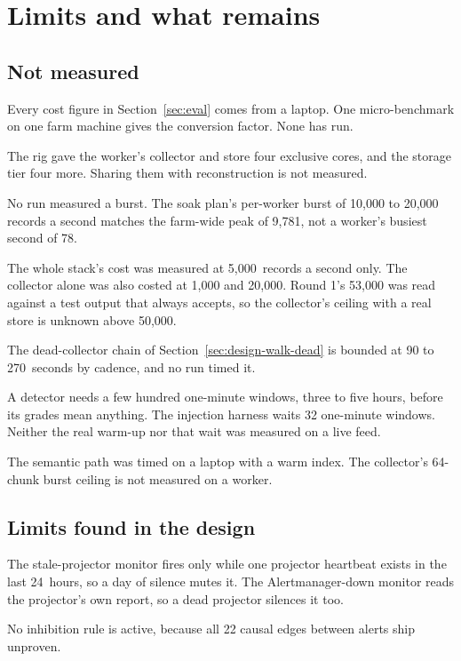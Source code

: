 \section{Limits and what remains}\label{sec:limits}

\subsection{Not measured}\label{sec:limits-unmeasured}

Every cost figure in Section~\ref{sec:eval} comes from a laptop. One micro-benchmark on one farm machine gives the conversion factor. None has run.

The rig gave the worker's collector and store four exclusive cores, and the storage tier four more. Sharing them with reconstruction is not measured.

No run measured a burst. The soak plan's per-worker burst of 10,000 to 20,000 records a second matches the farm-wide peak of 9,781, not a worker's busiest second of 78.

The whole stack's cost was measured at 5,000~records a second only. The collector alone was also costed at 1,000 and 20,000. Round 1's 53,000 was read against a test output that always accepts, so the collector's ceiling with a real store is unknown above 50,000.

The dead-collector chain of Section~\ref{sec:design-walk-dead} is bounded at 90 to 270~seconds by cadence, and no run timed it.

A detector needs a few hundred one-minute windows, three to five hours, before its grades mean anything. The injection harness waits 32 one-minute windows. Neither the real warm-up nor that wait was measured on a live feed.

The semantic path was timed on a laptop with a warm index. The collector's 64-chunk burst ceiling is not measured on a worker.

\subsection{Limits found in the design}\label{sec:limits-design}

The stale-projector monitor fires only while one projector heartbeat exists in the last 24~hours, so a day of silence mutes it. The Alertmanager-down monitor reads the projector's own report, so a dead projector silences it too.

No inhibition rule is active, because all 22 causal edges between alerts ship unproven.

